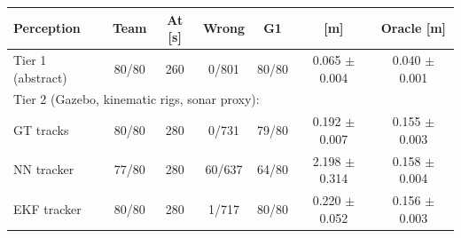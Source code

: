 \begin{tabular}{lcccccc}
\toprule
Perception & Team & At [s] & Wrong & G1 & \avatar{} [m] & Oracle [m] \\
\midrule
Tier 1 (abstract) & 80/80 & 260 & 0/801 & 80/80 & 0.065 $\pm$ 0.004 & 0.040 $\pm$ 0.001 \\
\multicolumn{7}{l}{Tier 2 (Gazebo, kinematic rigs, sonar proxy):} \\
\quad GT tracks & 80/80 & 280 & 0/731 & 79/80 & 0.192 $\pm$ 0.007 & 0.155 $\pm$ 0.003 \\
\quad NN tracker & 77/80 & 280 & 60/637 & 64/80 & 2.198 $\pm$ 0.314 & 0.158 $\pm$ 0.004 \\
\quad EKF tracker & 80/80 & 280 & 1/717 & 80/80 & 0.220 $\pm$ 0.052 & 0.156 $\pm$ 0.003 \\
\bottomrule
\end{tabular}

